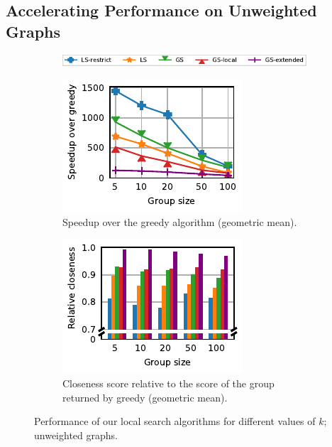 \subsection{Accelerating Performance on Unweighted Graphs}
%
\begin{figure}[tb]
\centering
\begin{subfigure}[t]{\textwidth}
\centering
\includegraphics{./sources/plots/local-search-heu/legend-unweighted.pdf}
\end{subfigure}
\centering
\begin{subfigure}[t]{.45\textwidth}
\centering
\includegraphics{./sources/plots/local-search-heu/speedups-unweighted.pdf}
\caption{Speedup over the greedy algorithm (geometric mean).}
\label{fig:lsh-gc-speedup-unweighted}
\end{subfigure}\hfill
\begin{subfigure}[t]{.5\textwidth}
\centering
\includegraphics{./sources/plots/local-search-heu/quality-unweighted.pdf}
\caption{Closeness score relative to the score of the group returned by greedy
(geometric mean).}
\label{fig:lsh-gc-quality-unweighted}
\end{subfigure}
\caption{Performance of our local search algorithms for different values of $k$;
unweighted graphs.}
\label{fig:lsh-gc-perf-unweighted}
\end{figure}

